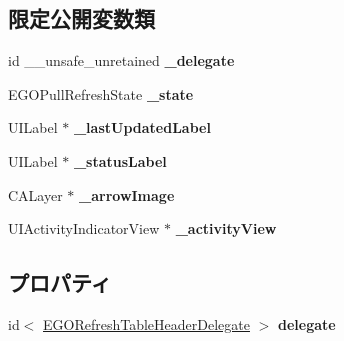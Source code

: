 \subsection*{限定公開変数類}
\begin{DoxyCompactItemize}
\item 
\hypertarget{interface_e_g_o_refresh_table_header_view_a3ab3484d1669f31a858f810db8bb688c}{}id \+\_\+\+\_\+unsafe\+\_\+unretained {\bfseries \+\_\+delegate}\label{interface_e_g_o_refresh_table_header_view_a3ab3484d1669f31a858f810db8bb688c}

\item 
\hypertarget{interface_e_g_o_refresh_table_header_view_a7e3364bb70f2ccceaabff9637849ae4d}{}E\+G\+O\+Pull\+Refresh\+State {\bfseries \+\_\+state}\label{interface_e_g_o_refresh_table_header_view_a7e3364bb70f2ccceaabff9637849ae4d}

\item 
\hypertarget{interface_e_g_o_refresh_table_header_view_ad2cad787cbd4f7e14e460f70140cc2e3}{}U\+I\+Label $\ast$ {\bfseries \+\_\+last\+Updated\+Label}\label{interface_e_g_o_refresh_table_header_view_ad2cad787cbd4f7e14e460f70140cc2e3}

\item 
\hypertarget{interface_e_g_o_refresh_table_header_view_a845f097294717d7ad7b4aa2042f33504}{}U\+I\+Label $\ast$ {\bfseries \+\_\+status\+Label}\label{interface_e_g_o_refresh_table_header_view_a845f097294717d7ad7b4aa2042f33504}

\item 
\hypertarget{interface_e_g_o_refresh_table_header_view_a3796bb4d359154e73b536bc64246a060}{}C\+A\+Layer $\ast$ {\bfseries \+\_\+arrow\+Image}\label{interface_e_g_o_refresh_table_header_view_a3796bb4d359154e73b536bc64246a060}

\item 
\hypertarget{interface_e_g_o_refresh_table_header_view_ab2c575e05450facb6ce9a60e825bb592}{}U\+I\+Activity\+Indicator\+View $\ast$ {\bfseries \+\_\+activity\+View}\label{interface_e_g_o_refresh_table_header_view_ab2c575e05450facb6ce9a60e825bb592}

\end{DoxyCompactItemize}
\subsection*{プロパティ}
\begin{DoxyCompactItemize}
\item 
\hypertarget{interface_e_g_o_refresh_table_header_view_a0ac65ad5457e9999ecdd6d05a7806d49}{}id$<$ \hyperlink{protocol_e_g_o_refresh_table_header_delegate-p}{E\+G\+O\+Refresh\+Table\+Header\+Delegate} $>$ {\bfseries delegate}\label{interface_e_g_o_refresh_table_header_view_a0ac65ad5457e9999ecdd6d05a7806d49}

\end{DoxyCompactItemize}


